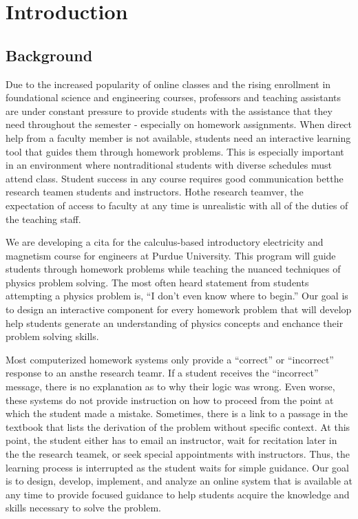 \chapter[Introduction]{Introduction}

\section{Background}

Due to the increased popularity of online classes and the rising enrollment in foundational science and engineering courses, professors and teaching assistants are under constant pressure to provide students with the assistance that they need throughout the semester - especially on homework assignments. When direct help from a faculty member is not available, students need an interactive learning tool that guides them through homework problems. This is especially important in an environment where nontraditional students with diverse schedules must attend class\cite{choy2002, horn1996}. Student success in any course requires good communication betthe research teamen students and instructors. Hothe research teamver, the expectation of access to faculty at any time is unrealistic with all of the duties of the teaching staff.

We are developing a \gls{cita} for the calculus-based introductory electricity and magnetism course for engineers at Purdue University. This program will guide students through homework problems while teaching the nuanced techniques of physics problem solving. The most often heard statement from students attempting a physics problem is, ``I don’t even know where to begin.'' Our goal is to design an interactive component for every homework problem that will develop help students generate an understanding of physics concepts and enchance their problem solving skills.

Most computerized homework systems only provide a ``correct'' or ``incorrect'' response to an ansthe research teamr. If a student receives the ``incorrect'' message, there is no explanation as to why their logic was wrong. Even worse, these systems do not provide instruction on how to proceed from the point at which the student made a mistake. Sometimes, there is a link to a passage in the textbook that lists the derivation of the problem without specific context. At this point, the student either has to email an instructor, wait for recitation later in the the research teamek, or seek special appointments with instructors. Thus, the learning process is interrupted as the student waits for simple guidance. Our goal is to design, develop, implement, and analyze an online system that is available at any time to provide focused guidance to help students acquire the knowledge and skills necessary to solve the problem.

